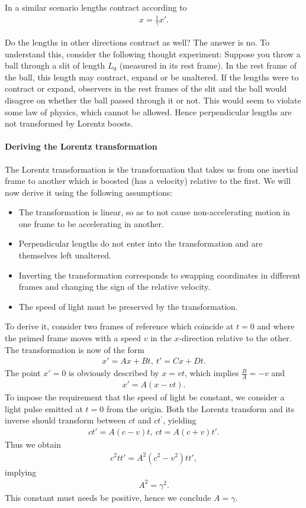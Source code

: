 In a similar scenario lengths contract according to
\begin{align*}
	x = \frac{1}{\gamma}x'.
\end{align*}

Do the lengths in other directions contract as well? The answer is no. To understand this, consider the following thought experiment: Suppose you throw a ball through a slit of length $L_{0}$ (measured in its rest frame). In the rest frame of the ball, this length may contract, expand or be unaltered. If the lengths were to contract or expand, observers in the rest frames of the slit and the ball would disagree on whether the ball passed through it or not. This would seem to violate some law of physics, which cannot be allowed. Hence perpendicular lengths are not transformed by Lorentz boosts.

\paragraph{Deriving the Lorentz transformation}
The Lorentz transformation is the transformation that takes us from one inertial frame to another which is boosted (has a velocity) relative to the first. We will now derive it using the following assumptions:
\begin{itemize}
	\item The transformation is linear, so as to not cause non-accelerating motion in one frame to be accelerating in another.
	\item Perpendicular lengths do not enter into the transformation and are themselves left unaltered.
	\item Inverting the transformation corresponds to swapping coordinates in different frames and changing the sign of the relative velocity.
	\item The speed of light must be preserved by the transformation.
\end{itemize}

To derive it, consider two frames of reference which coincide at $t = 0$ and where the primed frame moves with a speed $v$ in the $x$-direction relative to the other. The transformation is now of the form
\begin{align*}
	x' = Ax + Bt, \ t' = Cx + Dt.
\end{align*}
The point $x' = 0$ is obviously described by $x = vt$, which implies $\frac{B}{A} = -v$ and
\begin{align*}
	x' = A(x - vt).
\end{align*}
To impose the requirement that the speed of light be constant, we consider a light pulse emitted at $t = 0$ from the origin. Both the Lorentz transform and its inverse should transform between $ct$ and $ct^{\prime}$, yielding
\begin{align*}
	ct' = A(c - v)t, \ ct = A(c + v)t'.
\end{align*}
Thus we obtain
\begin{align*}
	c^{2}tt' = A^{2}(c^{2} - v^{2})tt',
\end{align*}
implying
\begin{align*}
	A^{2} = \gamma^{2}.
\end{align*}
This constant must needs be positive, hence we conclude $A = \gamma$.

